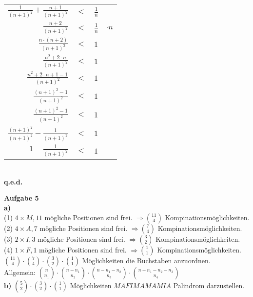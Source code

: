 \documentclass[a4paper]{scrartcl}
\begin{document}
\begin{flushleft}
\begin{center}
\begin{tabular}{rcl | l}
		$\frac{1}{(n+1)^2}+\frac{n+1}{(n+1)^2}$ & $<$ & $\frac{1}{n}$ & \\
		$\frac{n+2}{(n+1)^2}$ & $<$ & $\frac{1}{n}$ & $\cdot n$\\
		$\frac{n\cdot(n+2)}{(n+1)^2}$ & $<$ & $1$ & \\
		$\frac{n^2+2\cdot n}{(n+1)^2}$ & $<$ & $1$ & \\
		$\frac{n^2+2\cdot n+1-1}{(n+1)^2}$ & $<$ & $1$ & \\
		$\frac{(n+1)^2-1}{(n+1)^2}$ & $<$ & $1$ & \\
		$\frac{(n+1)^2-1}{(n+1)^2}$ & $<$ & $1$ & \\
		$\frac{(n+1)^2}{(n+1)^2}-\frac{1}{(n+1)^2}$ & $<$ & $1$ & \\
		$1-\frac{1}{(n+1)^2}$ & $<$ & $1$ & \\
		\end{tabular}\\[1em]
		\textbf{q.e.d.}\\
		\end{center}
	\end{flushleft}
	\begin{flushleft}
		\textbf{Aufgabe 5}\\
		\textbf{a)}\\
		(1) $4\times M, 11$ mögliche Positionen sind frei. $\Rightarrow \binom{11}{4}$ Kompinationsmöglichkeiten.\\
		(2) $4\times A, 7$ mögliche Positionen sind frei. $\Rightarrow \binom{7}{4}$ Kompinationsmöglichkeiten.\\
		(3) $2\times I, 3$ mögliche Positionen sind frei. $\Rightarrow \binom{3}{2}$ Kompinationsmöglichkeiten.\\
		(4) $1\times F, 1$ mögliche Positionen sind frei. $\Rightarrow \binom{1}{1}$ Kompinationsmöglichkeiten.\\[1em]
		$\binom{11}{4}\cdot \binom{7}{4}\cdot \binom{3}{2}\cdot \binom{1}{1}$ Möglichkeiten die Buchstaben anzuordnen.\\[1em]
		Allgemein: $\binom{n}{n_1}\cdot \binom{n-n_1}{n_2}\cdot \binom{n-n_1-n_2}{n_3}\cdot \binom{n-n_1-n_2-n_3}{n_4}$\\[1em]

		\textbf{b)} $\binom{5}{2}\cdot \binom{3}{2}\cdot \binom{1}{1}$ Möglichkeiten $MAFIMAMAMIA$ Palindrom darzustellen.\\[1em]
	\end{flushleft}
\end{document}
